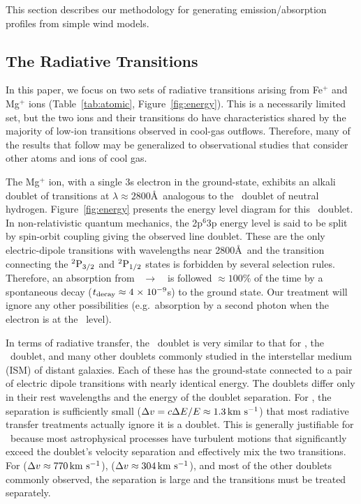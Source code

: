 \documentclass[12pt,preprint]{aastex}
\begin{document}
This section describes our methodology for generating
emission/absorption profiles from simple wind models.

\subsection{The Radiative Transitions}

In this paper, we focus on two sets of radiative transitions
arising from Fe$^+$ and Mg$^+$ ions
(Table~\ref{tab:atomic}, Figure~\ref{fig:energy}).
This is a necessarily limited
set, but the two ions and their transitions do have characteristics
shared by the majority of low-ion transitions
observed in cool-gas outflows. Therefore, many
of the results that follow may be generalized to observational studies that
consider other atoms and ions of cool gas.

The Mg$^+$ ion, with a single 3s electron in the ground-state,
exhibits an alkali doublet of transitions at $\lambda \approx
2800$\AA\ analogous to the
\lya\ doublet of neutral hydrogen.  Figure~\ref{fig:energy}
presents the energy level diagram for this 
\mgiid\ doublet.  In non-relativistic quantum
mechanics, the 2p$^6$3p energy level is said to be split by spin-orbit
coupling giving the observed line doublet.  These are the only
 electric-dipole transitions 
with wavelengths near 2800\AA\ and the transition connecting
the $\rm {}^2P_{3/2}$ and $\rm {}^2P_{1/2}$ states is forbidden by several
selection rules.  Therefore, an absorption from
\maconfig~$\to$~\mbconfig\
is followed $\approx 100\%$ of the time by a spontaneous decay
($t_{\rm decay} \approx 4{\; \times \; 10^{-9}}$s) to the
ground state. Our treatment will ignore any other possibilities
(e.g.\ absorption by a second photon when the electron is at the \mbconfig\ level).

In terms of radiative transfer, the 
\mgiid\ doublet is very similar to that for 
\lya, the \naid\ doublet, and many other doublets commonly
studied in the interstellar medium (ISM) of distant galaxies.  
Each of these has the ground-state connected to a pair of electric
dipole transitions with nearly identical energy.
The doublets differ only in 
their rest wavelengths and the energy of the doublet separation. 
For \ion{H}{1} \lya, the
separation is sufficiently small ($\Delta v = c \Delta E / E \approx
1.3 \, {\rm km~s^{-1}}$) that most radiative transfer treatments actually ignore it
is a doublet.
This is generally justifiable for \lya\ because 
most astrophysical processes have turbulent motions that
significantly exceed the doublet's velocity separation and effectively mix the
two transitions.  For \ion{Mg}{2} ($\Delta v \approx 770 \, {\rm km~s^{-1}}$),  
\ion{Na}{1} ($\Delta v \approx 304 \, {\rm km~s^{-1}}$), and most of the other doublets
commonly observed, the separation is large and the transitions
must be treated separately.  
\end{document}
